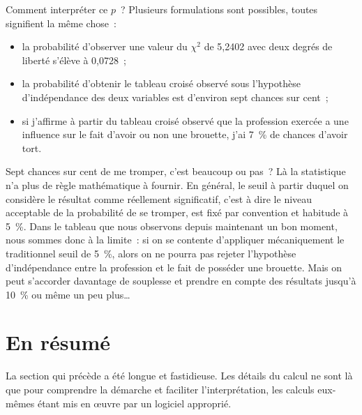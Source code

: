 \documentclass[a4paper,10pt,twoside,francais]{report}
\newcommand{\chid}{$\chi^2$\xspace}
\begin{document}
Comment interpréter ce $p$~? Plusieurs formulations sont possibles,
toutes signifient la même chose~:

\begin{itemize}
\item la probabilité d'observer une valeur du \chid de 5,2402 avec
  deux degrés de liberté s'élève à 0,0728~;
\item la probabilité d'obtenir le tableau croisé observé sous
  l'hypothèse d'indépendance des deux variables est d'environ sept
  chances sur cent~;
\item si j'affirme à partir du tableau croisé observé que la
  profession exercée a une influence sur le fait d'avoir ou non une
  brouette, j'ai 7~\% de chances d'avoir tort.
\end{itemize}

Sept chances sur cent de me tromper, c'est beaucoup ou pas~? Là la
statistique n'a plus de règle mathématique à fournir. En général, le
seuil à partir duquel on considère le résultat comme réellement
significatif, c'est à dire le niveau \og acceptable \fg{} de la
probabilité de se tromper, est fixé par convention et habitude à
5~\%. Dans le tableau que nous observons depuis maintenant un bon
moment, nous sommes donc à la limite~: si on se contente d'appliquer
mécaniquement le traditionnel seuil de 5~\%, alors on ne pourra pas
rejeter l'hypothèse d'indépendance entre la profession et le
fait de posséder une brouette. Mais on peut s'accorder davantage de
souplesse et prendre en compte des résultats jusqu'à 10~\% ou même un
peu plus\ldots


\section{En résumé}

La section qui précède a été longue et fastidieuse. Les détails du
calcul ne sont là que pour comprendre la démarche et faciliter
l'interprétation, les calculs eux-mêmes étant mis en \oe{}uvre par un
logiciel approprié.
\end{document}
